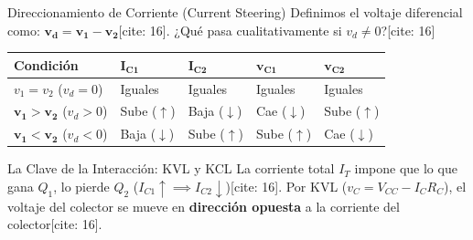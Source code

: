\documentclass[aspectratio=169]{beamer}
\begin{document}
\begin{frame}{Direccionamiento de Corriente (Current Steering)}
    Definimos el voltaje diferencial como: $\mathbf{v_d = v_1 - v_2}$[cite: 16]. ¿Qué pasa cualitativamente si $v_d \neq 0$?[cite: 16]
    
    \vspace{0.1cm}
    \begin{table}
        \centering
        \small
        \renewcommand{\arraystretch}{1.3}
        \begin{tabularx}{0.95\textwidth}{|>{\raggedright\arraybackslash}p{2.5cm}|>{\centering\arraybackslash}X|>{\centering\arraybackslash}X|>{\centering\arraybackslash}X|>{\centering\arraybackslash}X|}
        \hline
        \rowcolor{ucbblue!20}
        \textbf{Condición} & $\mathbf{I_{C1}}$ & $\mathbf{I_{C2}}$ & $\mathbf{v_{C1}}$ & $\mathbf{v_{C2}}$ \\ \hline
        $v_1 = v_2$ ($v_d = 0$) & Iguales & Iguales & Iguales & Iguales \\ \hline
        $\mathbf{v_1 > v_2}$ ($v_d > 0$) & Sube ($\uparrow$) & Baja ($\downarrow$) & Cae ($\downarrow$) & Sube ($\uparrow$) \\ \hline
        $\mathbf{v_1 < v_2}$ ($v_d < 0$) & Baja ($\downarrow$) & Sube ($\uparrow$) & Sube ($\uparrow$) & Cae ($\downarrow$) \\ \hline
        \end{tabularx}
    \end{table}
    
    \vspace{0.1cm}
    \begin{alertblock}{La Clave de la Interacción: KVL y KCL}
        La corriente total $I_T$ impone que lo que gana $Q_1$, lo pierde $Q_2$ ($I_{C1} \uparrow \implies I_{C2} \downarrow$)[cite: 16]. Por KVL ($v_C = V_{CC} - I_C R_C$), el voltaje del colector se mueve en \textbf{dirección opuesta} a la corriente del colector[cite: 16].
    \end{alertblock}
\end{frame}
\end{document}
